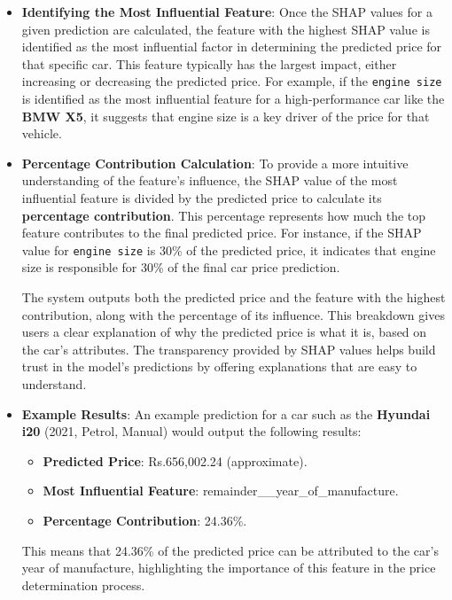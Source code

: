 \documentclass[a4paper,12pt]{article}
\begin{document}
\begin{justify}
\begin{itemize}
		\item \textbf{Identifying the Most Influential Feature}:
		Once the SHAP values for a given prediction are calculated, the feature with the highest SHAP value is identified as the most influential factor in determining the predicted price for that specific car. This feature typically has the largest impact, either increasing or decreasing the predicted price. For example, if the \texttt{engine size} is identified as the most influential feature for a high-performance car like the \textbf{BMW X5}, it suggests that engine size is a key driver of the price for that vehicle.
		
		\item \textbf{Percentage Contribution Calculation}:
		To provide a more intuitive understanding of the feature’s influence, the SHAP value of the most influential feature is divided by the predicted price to calculate its \textbf{percentage contribution}. This percentage represents how much the top feature contributes to the final predicted price. For instance, if the SHAP value for \texttt{engine size} is 30\% of the predicted price, it indicates that engine size is responsible for 30\% of the final car price prediction.
		
		The system outputs both the predicted price and the feature with the highest contribution, along with the percentage of its influence. This breakdown gives users a clear explanation of why the predicted price is what it is, based on the car’s attributes. The transparency provided by SHAP values helps build trust in the model's predictions by offering explanations that are easy to understand.
		
		\item \textbf{Example Results}:
		An example prediction for a car such as the \textbf{Hyundai i20} (2021, Petrol, Manual) would output the following results:
		\begin{itemize}
			\item \textbf{Predicted Price}: Rs.656,002.24 (approximate).
			\item \textbf{Most Influential Feature}: remainder\_\_year\_of\_manufacture.
			\item \textbf{Percentage Contribution}: 24.36\%.
		\end{itemize}
		This means that 24.36\% of the predicted price can be attributed to the car's year of manufacture, highlighting the importance of this feature in the price determination process.
	\end{itemize}
	
\end{justify}
\end{document}
